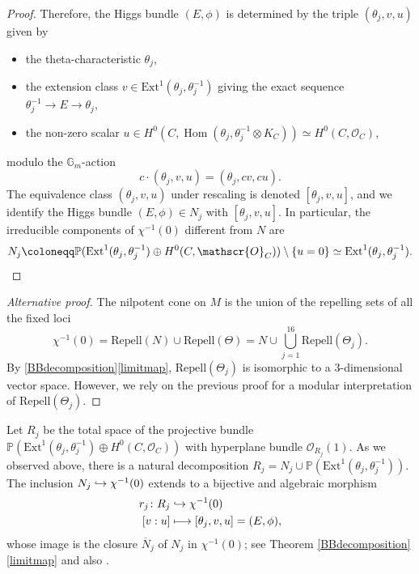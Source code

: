 \documentclass[JEP,XML,SOM,Unicode, NoEqCountersInSection,NoFloatCountersInSection,published]{cedram}
\let\mathcal\mathscr
\newcommand\mto{\mathchoice{\longmapsto}{\mapsto}{\mapsto}{\mapsto}}
\newcommand\hto{\mathrel{\lhook\joinrel\to}}
\theoremstyle{definition}
\newcommand{\Gm}{\mathbb{G}_m}
\newcommand{\PP}{\mathbb{P}}
\newcommand{\Hom}{\operatorname{Hom}}
\let\NBun N
\let\Rcomp R
\begin{document}
\begin{proof}
Therefore, the Higgs bundle $(E, \phi)$ is determined by the triple $(\theta_j, v, u)$ given by
\begin{itemize}
\item the theta-characteristic $\theta_j$,
\item the extension class $v \in \mathrm{Ext}^1(\theta_j, \theta^{-1}_j)$ giving the exact sequence $\theta^{-1}_j \to E\to \theta_j$,
\item the non-zero scalar $u \in H^0(C, \Hom(\theta_j, \theta^{-1}_j \otimes K_C)) \simeq H^0(C, \mathcal{O}_C)$,
\end{itemize}
modulo the $\Gm$\nobreakdash-action
\[
c \cdot (\theta_j, v, u)=(\theta_j, cv, cu).
\]
The equivalence class $(\theta_j, v, u)$ under rescaling is denoted $[\theta_j, v, u]$, and we identify the Higgs bundle $(E, \phi) \in \NBun_j$ with $[\theta_j, v, u]$. In particular, the irreducible components of $\chi^{-1}(0)$ different from $N$ are
\[
\NBun_j \coloneqq \PP(\mathrm{Ext}^1(\theta_j, \theta^{-1}_j) \oplus H^0(C, \mathcal{O}_C))\setminus \{u=0\} \simeq \mathrm{Ext}^1(\theta_j, \theta^{-1}_j).\qedhere
\]
\end{proof}

\begin{proof}[Alternative proof]
The nilpotent cone on $M$ is the union of the repelling sets of all the fixed loci
\[
\chi^{-1}(0)= \mathrm{Repell}(\NBun) \cup \mathrm{Repell}(\Theta) = \NBun \cup \bigcup^{16}_{j=1}\mathrm{Repell}(\Theta_j).
\]
By \cref{BBdecomposition}\eqref{limitmap}, $\mathrm{Repell}(\Theta_j)$ is isomorphic to a $3$-dimensional vector space. However, we rely on the previous proof for a modular interpretation of $\mathrm{Repell}(\Theta_j)$.
\end{proof}
Let $\Rcomp_j$ be the total space of the projective bundle
$\PP(\mathrm{Ext}^1(\theta_j, \theta^{-1}_j) \oplus H^0(C, \mathcal{O}_C))$ with hyperplane bundle $\mathcal{O}_{\Rcomp_j}(1)$.
As we observed above, there is a natural decomposition
$
\Rcomp_j = \NBun_j \cup \PP(\mathrm{Ext}^1(\theta_j, \theta^{-1}_j)).
$
The inclusion $\NBun_j \hto \chi^{-1}(0)$ extends to a bijective and algebraic morphism
\begin{align*}
r_j \colon \Rcomp_j & \hto \chi^{-1}(0)\\
[v:u] & \mto [\theta_j, v, u]=(E, \phi),
\end{align*}
whose image is the closure $\overline{\NBun}_j$ of $\NBun_j$ in $\chi^{-1}(0)$; see Theorem \ref{BBdecomposition}\eqref{limitmap} and also \cite[Prop.\,24]{Thaddeus89}.
\end{document}
